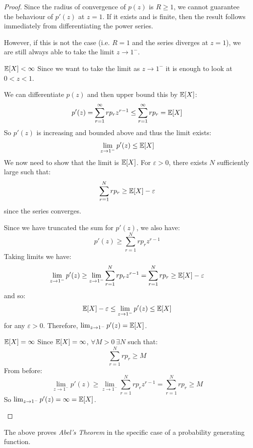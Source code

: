\documentclass[../main.tex]{subfiles}
\begin{document}
\begin{proof}
  Since the radius of convergence of $p(z)$ is $R \geq 1$, we cannot guarantee the behaviour of $p'(z)$ at $z = 1$.
  If it exists and is finite, then the result follows immediately from differentiating the power series.

  However, if this is not the case (i.e. $R = 1$ and the series diverges at $z = 1$), we are still always able to take the limit $z \to 1^{-}$.
  \begin{proofcases}
    \begin{case}{$\mathbb{E}[X] < \infty$}
      Since we want to take the limit as $z \to 1^{-}$ it is enough to look at $0 < z < 1$.

      We can differentiate $p(z)$ and then upper bound this by $\mathbb{E}[X]$:
      \[
        p'(z) = \sum_{r = 1}^{\infty} r p_r z^{r - 1} \leq \sum_{r = 1}^{\infty} r p_r = \mathbb{E}[X]
      \]
      So $p'(z)$ is increasing and bounded above and thus the limit exists:
      \[
        \lim_{z \to 1^-} p'(z) \leq \mathbb{E}[X]
      \]
      We now need to show that the limit is $\mathbb{E}[X]$.
      For $\varepsilon > 0$, there exists $N$ sufficiently large such that:
      \[
        \sum_{r = 1}^{N} r p_r \geq \mathbb{E}[X] - \varepsilon
      \]
      since the series converges.

      Since we have truncated the sum for $p'(z)$, we also have:
      \[
        p'(z) \geq \sum_{r = 1}^{N} rp_r z^{r - 1}
      \]
      Taking limits we have:
      \[
        \lim_{z \to 1^-} p'(z) \geq \lim_{z \to 1^-} \sum_{r = 1}^{N} r p_r z^{r - 1} = \sum_{r = 1}^{N} r p_r \geq \mathbb{E}[X] - \varepsilon
      \]
      and so:
      \[
        \mathbb{E}[X] - \varepsilon \leq \lim_{z \to 1^-} p'(z) \leq \mathbb{E}[X]
      \]
      for any $\varepsilon > 0$.
      Therefore, $\lim_{z \to 1^-} p'(z) = \mathbb{E}[X]$.
    \end{case}
    \begin{case}{$\mathbb{E}[X] = \infty$}
      Since $\mathbb{E}[X] = \infty$, $\forall M > 0\ \exists N$ such that:
      \[
        \sum_{r = 1}^{N} rp_r \geq M
      \]
      From before:
      \[
        \lim_{z \to 1^-} p'(z) \geq \lim_{z \to 1^-} \sum_{r = 1}^{N}  rp_r z^{r - 1} = \sum_{r = 1}^{N} r p_r \geq M
      \]
      So $\lim_{z \to 1^-} p'(z) = \infty = \mathbb{E}[X]$.
    \end{case}
  \end{proofcases}
\end{proof}
\begin{remark}
  \nonexaminable
  The above proves \textit{Abel's Theorem} in the specific case of a probability generating function.
\end{remark}
\end{document}
